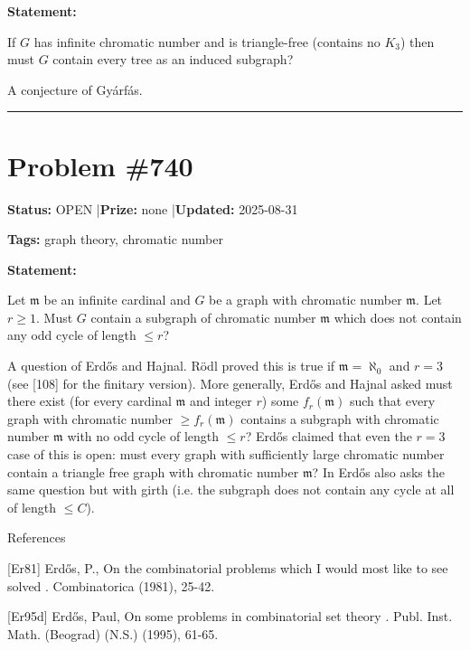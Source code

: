 \documentclass{article}
\begin{document}
\medskip

\noindent\textbf{Statement:}

If $G$ has infinite chromatic number and is triangle-free (contains no $K_3$) then must $G$ contain every tree as an induced subgraph?




A conjecture of Gy\'{a}rf\'{a}s.

\noindent\rule{\linewidth}{0.4pt}


\section{Problem \#740}
\label{prob:740}

\noindent\textbf{Status:} OPEN \quad|\quad \textbf{Prize:} none \quad|\quad \textbf{Updated:} 2025-08-31

\noindent\textbf{Tags:} graph theory, chromatic number

\medskip

\noindent\textbf{Statement:}

Let $\mathfrak{m}$ be an infinite cardinal and $G$ be a graph with chromatic number $\mathfrak{m}$. Let $r\geq 1$. Must $G$ contain a subgraph of chromatic number $\mathfrak{m}$ which does not contain any odd cycle of length $\leq r$?




A question of Erd\H{o}s and Hajnal. R\"{o}dl proved this is true if $\mathfrak{m}=\aleph_0$ and $r=3$ (see [108] for the finitary version). More generally, Erd\H{o}s and Hajnal asked must there exist (for every cardinal $\mathfrak{m}$ and integer $r$) some $f_r(\mathfrak{m})$ such that every graph with chromatic number $\geq f_r(\mathfrak{m})$ contains a subgraph with chromatic number $\mathfrak{m}$ with no odd cycle of length $\leq r$? Erd\H{o}s \cite{Er95d} claimed that even the $r=3$ case of this is open: must every graph with sufficiently large chromatic number contain a triangle free graph with chromatic number $\mathfrak{m}$? In \cite{Er81} Erd\H{o}s also asks the same question but with girth (i.e. the subgraph does not contain any cycle at all of length $\leq C$).




References

[Er81] Erd\H{o}s, P., On the combinatorial problems which I would most like to see solved . Combinatorica (1981), 25-42.

[Er95d] Erd\H{o}s, Paul, On some problems in combinatorial set theory . Publ. Inst. Math. (Beograd) (N.S.) (1995), 61-65.
\end{document}
